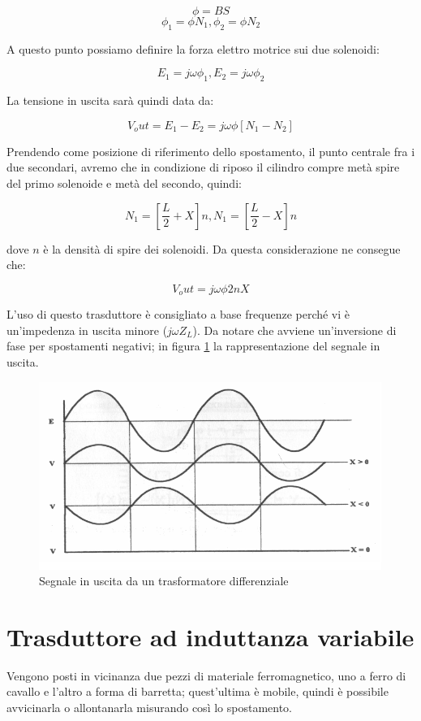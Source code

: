 	\[\phi=BS\]
	\[\phi_1=\phi N_1, \phi_2=\phi N_2 \]

A questo punto possiamo definire la forza elettro motrice sui due
solenoidi:

	\[E_1=j\omega\phi_1, E_2=j\omega\phi_2 \]

La tensione in uscita sarà quindi data da:

	\[V_out = E_1 - E_2 = j\omega\phi[N_1 - N_2]\]

Prendendo come posizione di riferimento dello spostamento, il punto
centrale fra i due secondari, avremo che in condizione di riposo il
cilindro compre metà spire del primo solenoide e metà del secondo,
quindi:

	\[N_1 = [\frac{L}{2}+X]n, N_1 = [\frac{L}{2}-X]n\]

dove $n$ è la densità di spire dei solenoidi. Da questa
considerazione ne consegue che:

	\[V_out=j\omega\phi 2nX\]

L'uso di questo trasduttore è consigliato a base frequenze perché vi
è un'impedenza in uscita minore ($j\omega Z_L$).
Da notare che avviene un'inversione di fase per spostamenti negativi;
in figura \ref{fig:trasdifffase} la rappresentazione del segnale in
uscita.

\begin{figure}[htbp]
	\centering
	\includegraphics[scale=0.5]
			{img/trasformatore-differenziale-fase.png}
	\caption{Segnale in uscita da un trasformatore
differenziale\label{fig:trasdifffase}}
\end{figure}

\section{Trasduttore ad induttanza variabile}
Vengono posti in vicinanza due pezzi di materiale ferromagnetico, uno
a ferro di cavallo e l'altro a forma di barretta; quest'ultima è
mobile, quindi è possibile avvicinarla o allontanarla misurando così
lo spostamento.

